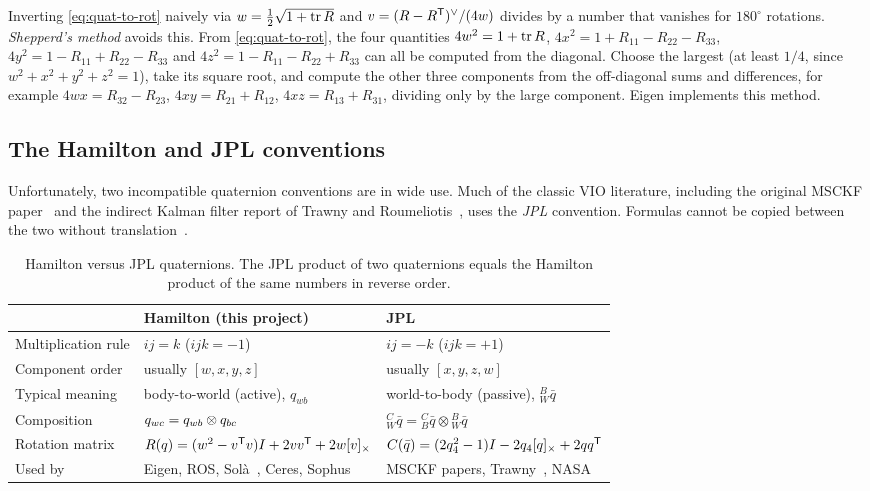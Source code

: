 Inverting \eqref{eq:quat-to-rot} naively via $w = \tfrac12\sqrt{1 + \operatorname{tr} R}$ and $v = (R - R^{\mathsf{T}})^{\vee}/(4w)$ divides by a number that vanishes for
$180^\circ$ rotations. \emph{Shepperd's method} avoids this. From \eqref{eq:quat-to-rot}, the four quantities
$4w^2 = 1 + \operatorname{tr} R$, $4x^2 = 1 + R_{11} - R_{22} - R_{33}$, $4y^2 = 1 - R_{11} + R_{22} - R_{33}$ and $4z^2 = 1 - R_{11} - R_{22} + R_{33}$ can all be computed
from the diagonal. Choose the largest (at least $1/4$, since $w^2 + x^2 + y^2 + z^2 = 1$), take its square root, and compute the other three components
from the off-diagonal sums and differences, for example $4wx = R_{32} - R_{23}$, $4xy = R_{21} + R_{12}$, $4xz = R_{13} + R_{31}$, dividing only by the large
component. Eigen implements this method.

\subsection{The Hamilton and JPL conventions}

Unfortunately, two incompatible quaternion conventions are in wide use. Much of the classic VIO literature, including the original MSCKF
paper~\cite{mourikis2007msckf} and the indirect Kalman filter report of Trawny and Roumeliotis~\cite{trawny2005indirect}, uses the
\emph{JPL} convention. Formulas cannot be copied between the two without translation~\cite{sommer2018flipped}.

\begin{table}[h]
\centering\small
\begin{tabularx}{\textwidth}{@{}l X X@{}}
\toprule
 & \textbf{Hamilton (this project)} & \textbf{JPL} \\
\midrule
Multiplication rule & $ij = k$ ($ijk = -1$) & $ij = -k$ ($ijk = +1$) \\
Component order & usually $[w, x, y, z]$ & usually $[x, y, z, w]$ \\
Typical meaning & body-to-world (active), $q_{wb}$ & world-to-body (passive), ${}^{B}_{W}\bar q$ \\
Composition & $q_{wc} = q_{wb}\otimes q_{bc}$ & ${}^{C}_{W}\bar q = {}^{C}_{B}\bar q\otimes{}^{B}_{W}\bar q$ \\
Rotation matrix & $R(q) = (w^2 - v^{\mathsf{T}} v)I + 2vv^{\mathsf{T}} + 2w[v]_{\times}$ & $C(\bar q) = (2q_4^2 - 1)I - 2q_4[q]_{\times} + 2qq^{\mathsf{T}}$ \\
Used by & Eigen, ROS, Sol\`a~\cite{sola2017quaternion}, Ceres, Sophus & MSCKF papers, Trawny~\cite{trawny2005indirect}, NASA \\
\bottomrule
\end{tabularx}
\caption{Hamilton versus JPL quaternions. The JPL product of two quaternions equals the Hamilton product of the same numbers in reverse order.}
\label{tab:hamilton-jpl}
\end{table}

